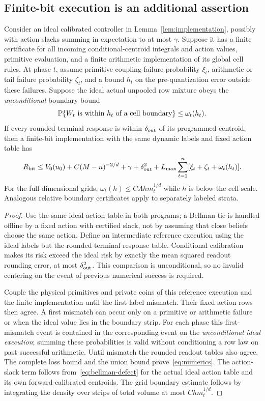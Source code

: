 \subsection{Finite-bit execution is an additional assertion}
\begin{proposition}\label{prop:numeric}
Consider an ideal calibrated controller in Lemma~\ref{lem:implementation}, possibly with action slacks summing in expectation to at most $\gamma$. Suppose it has a finite certificate for all incoming conditional-centroid integrals and action values, primitive evaluation, and a finite arithmetic implementation of its global cell rules. At phase $t$, assume primitive coupling failure probability $\xi_t$, arithmetic or tail failure probability $\zeta_t$, and a bound $h_t$ on the pre-quantization error outside these failures. Suppose the ideal actual unpooled row mixture obeys the \emph{unconditional} boundary bound
\[
 \mathbb P\{W_t\text{ is within }h_t\text{ of a cell boundary}\}\le\omega_t(h_t).
\]
If every rounded terminal response is within $\delta_{\rm out}$ of its programmed centroid, then a finite-bit implementation with the same dynamic labels and fixed action table has
\begin{equation}\label{eq:numerics}
 R_{\rm bit}\le V_0(u_0)+C(M-n)^{-2/d}+\gamma+\delta_{\rm out}^2
       +L_{\max}\sum_{t=1}^n[\xi_t+\zeta_t+\omega_t(h_t)].
\end{equation}
For the full-dimensional grids, $\omega_t(h)\le C\Lambda h m_t^{1/d}$ while $h$ is below the cell scale. Analogous relative boundary certificates apply to separately labeled strata.
\end{proposition}
\begin{proof}
Use the same ideal action table in both programs; a Bellman tie is handled offline by a fixed action with certified slack, not by assuming that close beliefs choose the same action. Define an intermediate reference execution using the ideal labels but the rounded terminal response table. Conditional calibration makes its risk exceed the ideal risk by exactly the mean squared readout rounding error, at most $\delta_{\rm out}^2$. This comparison is unconditional, so no invalid centering on the event of previous numerical success is required.

Couple the physical primitives and private coins of this reference execution and the finite implementation until the first label mismatch. Their fixed action rows then agree. A first mismatch can occur only on a primitive or arithmetic failure or when the ideal value lies in the boundary strip. For each phase this first-mismatch event is contained in the corresponding event on the \emph{unconditional ideal execution}; summing these probabilities is valid without conditioning a row law on past successful arithmetic. Until mismatch the rounded readout tables also agree. The complete loss bound and the union bound prove~\eqref{eq:numerics}. The action-slack term follows from~\eqref{eq:bellman-defect} for the actual ideal action table and its own forward-calibrated centroids. The grid boundary estimate follows by integrating the density over strips of total volume at most $C h m_t^{1/d}$.
\end{proof}

